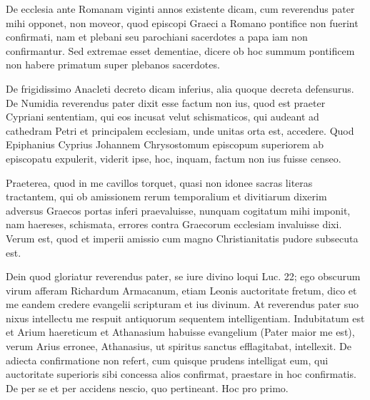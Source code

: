 De ecclesia ante Romanam viginti annos existente dicam, cum reverendus pater mihi opponet, non moveor, quod episcopi Graeci a Romano pontifice non fuerint confirmati, nam et plebani seu parochiani sacerdotes a papa iam non confirmantur. Sed extremae esset dementiae, dicere ob hoc summum pontificem non habere primatum super plebanos sacerdotes.

De frigidissimo Anacleti decreto dicam inferius, alia quoque decreta defensurus. De Numidia reverendus pater dixit esse factum non ius, quod est praeter Cypriani sententiam, qui eos incusat velut schismaticos, qui audeant ad cathedram Petri et principalem ecclesiam, unde unitas orta est, accedere. Quod Epiphanius Cyprius Johannem Chrysostomum episcopum superiorem ab episcopatu expulerit, viderit ipse, hoc, inquam, factum non ius fuisse censeo.

Praeterea, quod in me cavillos torquet, quasi non idonee sacras literas tractantem, qui ob amissionem rerum temporalium et divitiarum dixerim adversus Graecos portas inferi praevaluisse, nunquam cogitatum mihi imponit, nam haereses, schismata, errores contra Graecorum ecclesiam invaluisse dixi. Verum est, quod et imperii amissio cum magno Christianitatis pudore subsecuta est.

Dein quod gloriatur reverendus pater, se iure divino loqui Luc. 22; ego obscurum virum afferam Richardum Armacanum, etiam Leonis auctoritate fretum, dico et me eandem credere evangelii scripturam et ius divinum. At reverendus pater suo nixus intellectu me respuit antiquorum sequentem intelligentiam. Indubitatum est et Arium haereticum et Athanasium habuisse evangelium (Pater maior me est), verum Arius erronee, Athanasius, ut spiritus sanctus efflagitabat, intellexit. De adiecta confirmatione non refert, cum quisque prudens intelligat eum, qui auctoritate superioris sibi concessa alios confirmat, praestare in hoc confirmatis. De per se et per accidens nescio, quo pertineant. Hoc pro primo.

